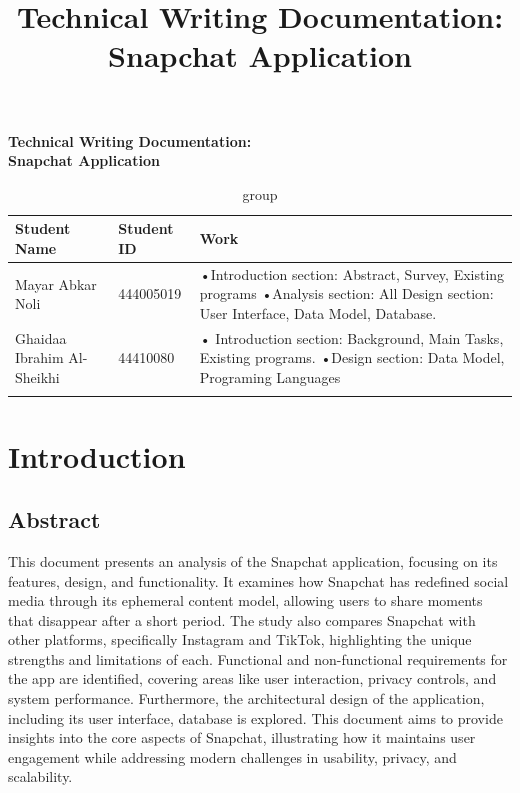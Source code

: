 \documentclass{article}
\title{Technical Writing Documentation: Snapchat Application}
\author{}
\date{}
\begin{document}
\newpage
\begin{center}
    {\LARGE \textbf{Technical Writing Documentation:}} \\
    \vspace{0.5cm}
    {\LARGE \textbf{Snapchat Application}}
\end{center}
\vspace{3cm}
\begin{longtable}{|p{3cm}|p{2.5cm}|p{7cm}|}
    \hline
    \textbf{ Student Name } & \textbf{ Student ID } & \textbf{ Work } \\
    \hline
    Mayar Abkar Noli & 
    444005019 &
    •Introduction section: Abstract, Survey, Existing programs \newline
    •Analysis section: All \newline
    Design section: User Interface, Data Model, Database. 
    \\
    \hline
    Ghaidaa Ibrahim Al-Sheikhi & 
        44410080 &
    • Introduction section: Background, Main Tasks, Existing programs. \newline
    •Design section: Data Model, Programing Languages \\
    \hline
    \caption{group}
    \label{tab:group}
\end{longtable}


\newpage
\tableofcontents

\newpage
\section{Introduction}  

\subsection{Abstract}

This document presents an analysis of the Snapchat application, focusing on its features, design, and functionality. It examines how Snapchat has redefined social media through its ephemeral content model, allowing users to share moments that disappear after a short period. The study also compares Snapchat with other platforms, specifically Instagram and TikTok, highlighting the unique strengths and limitations of each. Functional and non-functional requirements for the app are identified, covering areas like user interaction, privacy controls, and system performance. Furthermore, the architectural design of the application, including its user interface, database is explored. This document aims to provide insights into the core aspects of Snapchat, illustrating how it maintains user engagement while addressing modern challenges in usability, privacy, and scalability.
\end{document}

